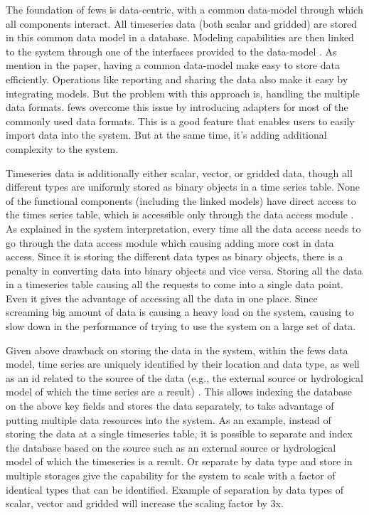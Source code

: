 The foundation of \acrshort{fews} is data-centric, with a common data-model through which all components interact. All timeseries data (both scalar and gridded) are stored in this common data model in a database. Modeling capabilities are then linked to the system through one of the interfaces provided to the data-model \cite{Werner2013TheSystem}. As mention in the paper, having a common data-model make easy to store data efficiently. Operations like reporting and sharing the data also make it easy by integrating models. But the problem with this approach is, handling the multiple data formats. \acrshort{fews} overcome this issue by introducing adapters for most of the commonly used data formats. This is a good feature that enables users to easily import data into the system. But at the same time, it's adding additional complexity to the system.

Timeseries data is additionally either scalar, vector, or gridded data, though all different types are uniformly stored as binary objects in a time series table. None of the functional components (including the linked models) have direct access to the times series table, which is accessible only through the data access module \cite{Werner2013TheSystem}. As explained in the system interpretation, every time all the data access needs to go through the data access module which causing adding more cost in data access. Since it is storing the different data types as binary objects, there is a penalty in converting data into binary objects and vice versa. Storing all the data in a timeseries table causing all the requests to come into a single data point. Even it gives the advantage of accessing all the data in one place. Since screaming big amount of data is causing a heavy load on the system, causing to slow down in the performance of trying to use the system on a large set of data.

Given above drawback on storing the data in the system, within the \acrshort{fews} data model, time series are uniquely identified by their location and data type, as well as an id related to the source of the data (e.g., the external source or hydrological model of which the time series are a result) \cite{Werner2013TheSystem}. This allows indexing the database on the above key fields and stores the data separately, to take advantage of putting multiple data resources into the system. As an example, instead of storing the data at a single timeseries table, it is possible to separate and index the database based on the source such as an external source or hydrological model of which the timeseries is a result. Or separate by data type and store in multiple storages give the capability for the system to scale with a factor of identical types that can be identified. Example of separation by data types of scalar, vector and gridded will increase the scaling factor by 3x.

